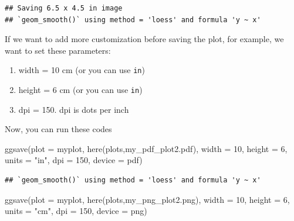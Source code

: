 \documentclass[
  10pt,
]{krantz}
\newenvironment{Shaded}{\begin{snugshade}}{\end{snugshade}}
\newcommand{\AttributeTok}[1]{\textcolor[rgb]{0.77,0.63,0.00}{#1}}
\newcommand{\DecValTok}[1]{\textcolor[rgb]{0.00,0.00,0.81}{#1}}
\newcommand{\FunctionTok}[1]{\textcolor[rgb]{0.00,0.00,0.00}{#1}}
\newcommand{\NormalTok}[1]{#1}
\newcommand{\StringTok}[1]{\textcolor[rgb]{0.31,0.60,0.02}{#1}}
\providecommand{\tightlist}{%
  \setlength{\itemsep}{0pt}\setlength{\parskip}{0pt}}
\begin{document}
\begin{verbatim}
## Saving 6.5 x 4.5 in image
## `geom_smooth()` using method = 'loess' and formula 'y ~ x'
\end{verbatim}

If we want to add more customization before saving the plot, for example, we want to set these parameters:

\begin{enumerate}
\def\labelenumi{\arabic{enumi}.}
\tightlist
\item
  width = 10 cm (or you can use \texttt{in})
\item
  height = 6 cm (or you can use \texttt{in})
\item
  dpi = 150. dpi is dots per inch
\end{enumerate}

Now, you can run these codes

\begin{Shaded}
\begin{Highlighting}[]
\FunctionTok{ggsave}\NormalTok{(}\AttributeTok{plot =}\NormalTok{ myplot, }
       \FunctionTok{here}\NormalTok{(}\StringTok{\textquotesingle{}plots\textquotesingle{}}\NormalTok{,}\StringTok{\textquotesingle{}my\_pdf\_plot2.pdf\textquotesingle{}}\NormalTok{), }
       \AttributeTok{width =} \DecValTok{10}\NormalTok{, }\AttributeTok{height =} \DecValTok{6}\NormalTok{, }\AttributeTok{units =} \StringTok{"in"}\NormalTok{,}
       \AttributeTok{dpi =} \DecValTok{150}\NormalTok{, }\AttributeTok{device =} \StringTok{\textquotesingle{}pdf\textquotesingle{}}\NormalTok{)}
\end{Highlighting}
\end{Shaded}

\begin{verbatim}
## `geom_smooth()` using method = 'loess' and formula 'y ~ x'
\end{verbatim}

\begin{Shaded}
\begin{Highlighting}[]
\FunctionTok{ggsave}\NormalTok{(}\AttributeTok{plot =}\NormalTok{ myplot, }
       \FunctionTok{here}\NormalTok{(}\StringTok{\textquotesingle{}plots\textquotesingle{}}\NormalTok{,}\StringTok{\textquotesingle{}my\_png\_plot2.png\textquotesingle{}}\NormalTok{), }
       \AttributeTok{width =} \DecValTok{10}\NormalTok{, }\AttributeTok{height =} \DecValTok{6}\NormalTok{, }\AttributeTok{units =} \StringTok{"cm"}\NormalTok{, }
       \AttributeTok{dpi =} \DecValTok{150}\NormalTok{, }\AttributeTok{device =} \StringTok{\textquotesingle{}png\textquotesingle{}}\NormalTok{)}
\end{Highlighting}
\end{Shaded}
\end{document}
